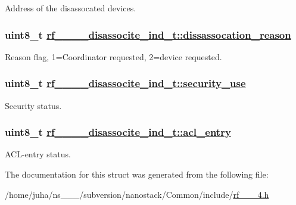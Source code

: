 Address of the disassocated devices. \hypertarget{structrf__802__15__4__disassocite__ind__t_3e3ee684fbf3997039fd244e72746c91}{
\subsubsection[dissassocation\_\-reason]{\setlength{\rightskip}{0pt plus 5cm}uint8\_\-t \hyperlink{structrf__802__15__4__disassocite__ind__t_3e3ee684fbf3997039fd244e72746c91}{rf\_\_\_\_\-disassocite\_\-ind\_\-t::dissassocation\_\-reason}}}
\label{structrf__802__15__4__disassocite__ind__t_3e3ee684fbf3997039fd244e72746c91}


Reason flag, 1=Coordinator requested, 2=device requested. \hypertarget{structrf__802__15__4__disassocite__ind__t_9cc973eea95551ccb75254d9eb3fd60a}{
\subsubsection[security\_\-use]{\setlength{\rightskip}{0pt plus 5cm}uint8\_\-t \hyperlink{structrf__802__15__4__disassocite__ind__t_9cc973eea95551ccb75254d9eb3fd60a}{rf\_\_\_\_\-disassocite\_\-ind\_\-t::security\_\-use}}}
\label{structrf__802__15__4__disassocite__ind__t_9cc973eea95551ccb75254d9eb3fd60a}


Security status. \hypertarget{structrf__802__15__4__disassocite__ind__t_8341fae36b6445ff2ffde3436eddd5f2}{
\subsubsection[acl\_\-entry]{\setlength{\rightskip}{0pt plus 5cm}uint8\_\-t \hyperlink{structrf__802__15__4__disassocite__ind__t_8341fae36b6445ff2ffde3436eddd5f2}{rf\_\_\_\_\-disassocite\_\-ind\_\-t::acl\_\-entry}}}
\label{structrf__802__15__4__disassocite__ind__t_8341fae36b6445ff2ffde3436eddd5f2}


ACL-entry status. 

The documentation for this struct was generated from the following file:\begin{CompactItemize}
\item 
/home/juha/ns\_\_\_/subversion/nanostack/Common/include/\hyperlink{rf__802__15__4_8h}{rf\_\_\_\-4.h}\end{CompactItemize}
